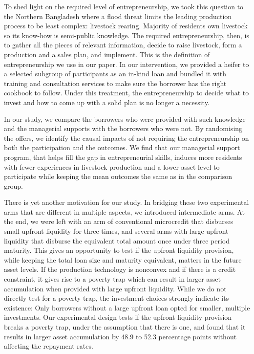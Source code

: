 	To shed light on the required level of entrepreneurship, we took this question to the Northern Bangladesh where a flood threat limits the leading production process to be least complex: livestock rearing. Majority of residents own livestock so its know-how is semi-public knowledge. The required entrepreneurship, then, is to gather all the pieces of relevant information, decide to raise livestock, form a production and a sales plan, and implement. This is the definition of entrepreneurship we use in our paper. In our intervention, we provided a heifer to a selected subgroup of participants as an in-kind loan and bundled it with training and consultation services to make sure the borrower has the right cookbook to follow. Under this treatment, the entrepreneurship to decide what to invest and how to come up with a solid plan is no longer a necessity.

	In our study, we compare the borrowers who were provided with such knowledge and the managerial supports with the borrowers who were not. By randomising the offers, we identify the causal impacts of not requiring the entrepreneurship on both the participation and the outcomes. We find that our managerial support program, that helps fill the gap in entrepreneurial skills, induces more residents with fewer experiences in livestock production and a lower asset level to participate while keeping the mean outcomes the same as in the comparison group.%

	There is yet another motivation for our study. In bridging these two experimental arms that are different in multiple aspects, we introduced intermediate arms. At the end, we were left with an arm of conventional microcredit that disburses small upfront liquidity for three times, and several arms with large upfront liquidity that disburse the equivalent total amount once under three period maturity. This gives an opportunity to test if the upfront liquidity provision, while keeping the total loan size and maturity equivalent, matters in the future asset levels. If the production technology is nonconvex and if there is a credit constraint, it gives rise to a poverty trap which can result in larger asset accumulation when provided with large upfront liquidity. While we do not directly test for a poverty trap, the investment choices strongly indicate its existence: Only borrowers without a large upfront loan opted for smaller, multiple investments. Our experimental design tests if the upfront liquidity provision breaks a poverty trap, under the assumption that there is one, and found that it results in larger asset accumulation by 48.9 to 52.3 percentage points without affecting the repayment rates.

